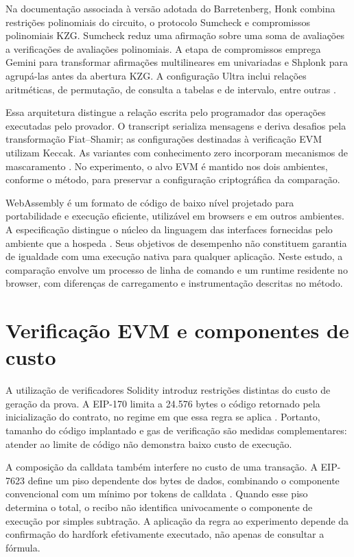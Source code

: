 Na documentação associada à versão adotada do Barretenberg, Honk combina restrições polinomiais do circuito, o protocolo Sumcheck e compromissos polinomiais KZG. Sumcheck reduz uma afirmação sobre uma soma de avaliações a verificações de avaliações polinomiais. A etapa de compromissos emprega Gemini para transformar afirmações multilineares em univariadas e Shplonk para agrupá-las antes da abertura KZG. A configuração Ultra inclui relações aritméticas, de permutação, de consulta a tabelas e de intervalo, entre outras \cite{ultrahonk}.

Essa arquitetura distingue a relação escrita pelo programador das operações executadas pelo provador. O transcript serializa mensagens e deriva desafios pela transformação Fiat--Shamir; as configurações destinadas à verificação EVM utilizam Keccak. As variantes com conhecimento zero incorporam mecanismos de mascaramento \cite{ultrahonk}. No experimento, o alvo EVM é mantido nos dois ambientes, conforme o método, para preservar a configuração criptográfica da comparação.

WebAssembly é um formato de código de baixo nível projetado para portabilidade e execução eficiente, utilizável em browsers e em outros ambientes. A especificação distingue o núcleo da linguagem das interfaces fornecidas pelo ambiente que a hospeda \cite{wasmspec}. Seus objetivos de desempenho não constituem garantia de igualdade com uma execução nativa para qualquer aplicação. Neste estudo, a comparação envolve um processo de linha de comando e um runtime residente no browser, com diferenças de carregamento e instrumentação descritas no método.

\section{Verificação EVM e componentes de custo}

A utilização de verificadores Solidity introduz restrições distintas do custo de geração da prova. A EIP-170 limita a 24.576 bytes o código retornado pela inicialização do contrato, no regime em que essa regra se aplica \cite{eip170}. Portanto, tamanho do código implantado e gas de verificação são medidas complementares: atender ao limite de código não demonstra baixo custo de execução.

A composição da calldata também interfere no custo de uma transação. A EIP-7623 define um piso dependente dos bytes de dados, combinando o componente convencional com um mínimo por tokens de calldata \cite{eip7623}. Quando esse piso determina o total, o recibo não identifica univocamente o componente de execução por simples subtração. A aplicação da regra ao experimento depende da confirmação do hardfork efetivamente executado, não apenas de consultar a fórmula.

